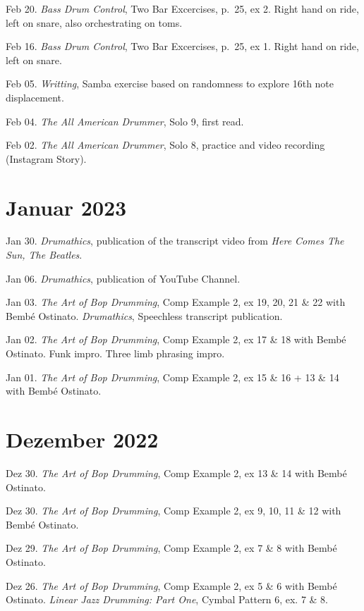 \documentclass[
]{book}
\begin{document}
Feb 20. \emph{Bass Drum Control}, Two Bar Excercises, p.~25, ex 2. Right hand on ride, left on snare, also orchestrating on toms.

Feb 16. \emph{Bass Drum Control}, Two Bar Excercises, p.~25, ex 1. Right hand on ride, left on snare.

Feb 05. \emph{Writting}, Samba exercise based on randomness to explore 16th note displacement.

Feb 04. \emph{The All American Drummer}, Solo 9, first read.

Feb 02. \emph{The All American Drummer}, Solo 8, practice and video recording (Instagram Story).

\hypertarget{januar-2023}{%
\section*{Januar 2023}\label{januar-2023}}

Jan 30. \emph{Drumathics}, publication of the transcript video from \emph{Here Comes The Sun, The Beatles}.

Jan 06. \emph{Drumathics}, publication of YouTube Channel.

Jan 03. \emph{The Art of Bop Drumming}, Comp Example 2, ex 19, 20, 21 \& 22 with Bembé Ostinato. \emph{Drumathics}, Speechless transcript publication.

Jan 02. \emph{The Art of Bop Drumming}, Comp Example 2, ex 17 \& 18 with Bembé Ostinato. Funk impro. Three limb phrasing impro.

Jan 01. \emph{The Art of Bop Drumming}, Comp Example 2, ex 15 \& 16 + 13 \& 14 with Bembé Ostinato.

\hypertarget{dezember-2022}{%
\section*{Dezember 2022}\label{dezember-2022}}

Dez 30. \emph{The Art of Bop Drumming}, Comp Example 2, ex 13 \& 14 with Bembé Ostinato.

Dez 30. \emph{The Art of Bop Drumming}, Comp Example 2, ex 9, 10, 11 \& 12 with Bembé Ostinato.

Dez 29. \emph{The Art of Bop Drumming}, Comp Example 2, ex 7 \& 8 with Bembé Ostinato.

Dez 26. \emph{The Art of Bop Drumming}, Comp Example 2, ex 5 \& 6 with Bembé Ostinato. \emph{Linear Jazz Drumming: Part One}, Cymbal Pattern 6, ex. 7 \& 8.
\end{document}
